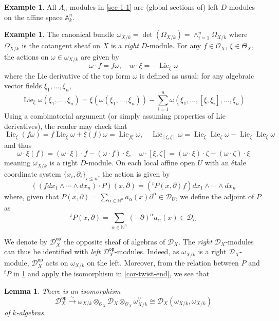 \documentclass[11pt, a4paper]{article}
\newtheorem{lemma}[theorem]{Lemma}
\theoremstyle{definition}
\newtheorem{example}[theorem]{Example}
\newcommand{\w}[0]{\omega}
\newcommand{\N}[0]{\mathbb{N}}
\newcommand{\op}[0]{\mathsf{op}}
\newcommand{\Lie}{\operatorname{Lie}}
\begin{document}
    \begin{example}
        All $A_n$-modules in \cref{sec-1-1} are (global sections of) left $D$-modules on the affine space $\mathbb A^n_k$.
    \end{example}
    \begin{example}\label{exp-canonical-bundle}
        The canonical bundle $\w_{X/k}=\det(\Omega_{X/k})=\wedge^n_{i=1}\Omega_{X/k}$ where $\Omega_{X/k}$ is the cotangent sheaf on $X$ is a \textit{right} $D$-module. For any $f\in\mathcal O_X$, $\xi\in\Theta_X$, the actions on $\w\in\w_{X/k}$ are given by
        \[\w\cdot f=f\w,\quad w\cdot\xi=-\Lie_\xi\w\]
        where the Lie derivative of the top form $\w$ is defined as usual: for any algebraic vector fields $\xi_1,\dots,\xi_n$,
        \[\Lie_\xi\w(\xi_1,\dots,\xi_n)=\xi(\w(\xi_1,\dots,\xi_n))-\sum_{i=1}^n\w(\xi_1,\dots,[\xi,\xi_i],\dots,\xi_n)\]
        Using a combinatorial argument (or simply assuming properties of Lie derivatives), the reader may check that
        \[\Lie_\xi(f\w)=f\Lie_\xi\w+\xi(f)\w=\Lie_{f\xi}\w,\quad \Lie_{[\xi,\zeta]}\w=\Lie_{\xi}\Lie_{\zeta}\w-\Lie_{\zeta}\Lie_\xi\w\]
        and thus
        \[\w\cdot\xi(f)=(\w\cdot\xi)\cdot f-(\w\cdot f)\cdot\xi,\quad \w\cdot[\xi,\zeta]=(\w\cdot\xi)\cdot\zeta-(\w\cdot\zeta)\cdot\xi\]
        meaning $\w_{X/k}$ is a right $D$-module. On each local affine open $U$ with an étale coordinate system $\{x_i,\partial_i\}_{i\leqslant n}$, the action is given by
        \[((fdx_1\wedge\cdots\wedge dx_n)\cdot P)(x,\partial)=({}^tP(x,\partial)f)dx_1\wedge\cdots\wedge dx_n\]
        where, given that $P(x,\partial)=\sum_{\alpha\in\N^n} a_\alpha(x)\partial^\alpha\in\mathcal D_U$, we define the adjoint of $P$ as
        \[{}^tP(x,\partial)=\sum_{\alpha\in\N^n}(-\partial)^\alpha a_\alpha(x)\in \mathcal D_U\]
    \end{example}
    We denote by $\mathcal D_X^\op$ the opposite sheaf of algebras of $\mathcal D_X$. The \textit{right} $\mathcal D_X$-modules can thus be identified with \textit{left} $\mathcal D_X^\op$-modules. Indeed, as $\w_{X/k}$ is a right $\mathcal D_X$-module, $\mathcal D_X^\op$ acts on $\w_{X/k}$ on the left. Moreover, from the relation between $P$ and ${}^tP$ in \cref{exp-canonical-bundle} and apply the isomorphism in \cref{cor-twist-end}, we see that
    \begin{lemma}
        There is an isomorphism 
        \[\mathcal D_X^\op\xrightarrow{\sim}\w_{X/k}\otimes_{\mathcal O_X}\mathcal D_X\otimes_{\mathcal O_X}\w_{X/k}^\vee\cong\mathcal D_X(\w_{X/k}, \w_{X/k})\]
        of $k$-algebras.
    \end{lemma}
\end{document}
